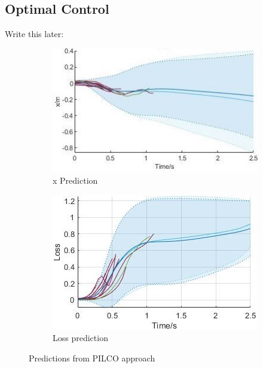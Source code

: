 \documentclass[twoside,twocolumn,12pt]{article}
\begin{document}
\subsection{Optimal Control}
 \color{red}
 Write this later:
 \color{black}
 
\begin{figure}[h]
  \centering
  \begin{subfigure}[t]{0.5\textwidth}
    \includegraphics[width=\linewidth]{u2}
  \caption{x Prediction} 
  \label{sub:ffffffs}
  \end{subfigure}
  \begin{subfigure}[t]{0.5\textwidth}
    \includegraphics[width=\linewidth]{loss2}
  \caption{Loss prediction}
  \label{sub:ffs}
  \end{subfigure}
  \caption{Predictions from PILCO approach}
  \label{fig:pilco}
\end{figure}
\end{document}
